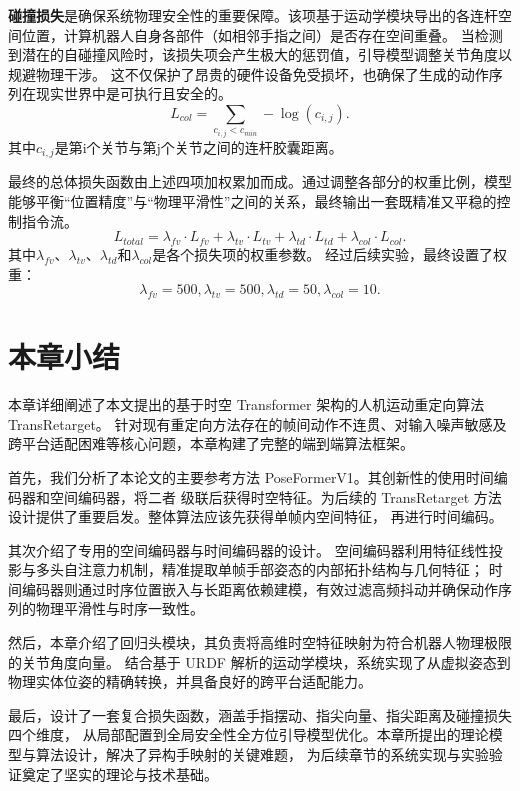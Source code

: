 \textbf{碰撞损失}是确保系统物理安全性的重要保障。该项基于运动学模块导出的各连杆空间位置，计算机器人自身各部件（如相邻手指之间）是否存在空间重叠。
当检测到潜在的自碰撞风险时，该损失项会产生极大的惩罚值，引导模型调整关节角度以规避物理干涉。
这不仅保护了昂贵的硬件设备免受损坏，也确保了生成的动作序列在现实世界中是可执行且安全的。
\begin{equation}
L_{col} = \sum_{c_{i,j} < c_{min}} -\log(c_{i,j}).
\end{equation}
其中$c_{i,j}$是第i个关节与第j个关节之间的连杆胶囊距离。

最终的总体损失函数由上述四项加权累加而成。通过调整各部分的权重比例，模型能够平衡“位置精度”与“物理平滑性”之间的关系，最终输出一套既精准又平稳的控制指令流。
\begin{equation}
L_{total}=\lambda_{fv} \cdot L_{fv} + \lambda_{tv} \cdot L_{tv} + \lambda_{td} \cdot L_{td} + \lambda_{col} \cdot L_{col}.
\end{equation}
其中$\lambda_{fv}$、$\lambda_{tv}$、$\lambda_{td}$和$\lambda_{col}$是各个损失项的权重参数。
经过后续实验，最终设置了权重：
\begin{equation}
\lambda_{fv} = 500, \lambda_{tv} = 500, \lambda_{td} = 50, \lambda_{col} = 10.
\end{equation}
\section{本章小结}
本章详细阐述了本文提出的基于时空 Transformer 架构的人机运动重定向算法TransRetarget。
针对现有重定向方法存在的帧间动作不连贯、对输入噪声敏感及跨平台适配困难等核心问题，本章构建了完整的端到端算法框架。

首先，我们分析了本论文的主要参考方法 PoseFormerV1。其创新性的使用时间编码器和空间编码器，将二者
级联后获得时空特征。为后续的 TransRetarget 方法设计提供了重要启发。整体算法应该先获得单帧内空间特征，
再进行时间编码。

其次介绍了专用的空间编码器与时间编码器的设计。
空间编码器利用特征线性投影与多头自注意力机制，精准提取单帧手部姿态的内部拓扑结构与几何特征；
时间编码器则通过时序位置嵌入与长距离依赖建模，有效过滤高频抖动并确保动作序列的物理平滑性与时序一致性。

然后，本章介绍了回归头模块，其负责将高维时空特征映射为符合机器人物理极限的关节角度向量。
结合基于 URDF 解析的运动学模块，系统实现了从虚拟姿态到物理实体位姿的精确转换，并具备良好的跨平台适配能力。

最后，设计了一套复合损失函数，涵盖手指摆动、指尖向量、指尖距离及碰撞损失四个维度，
从局部配置到全局安全性全方位引导模型优化。本章所提出的理论模型与算法设计，解决了异构手映射的关键难题，
为后续章节的系统实现与实验验证奠定了坚实的理论与技术基础。

